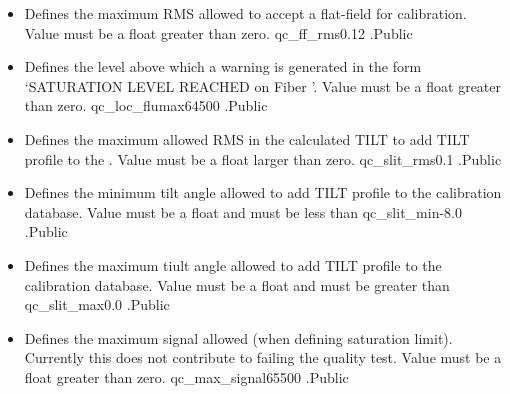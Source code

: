 \begin{itemize}
\item {}
{Defines the maximum RMS allowed to accept a flat-field for calibration. Value must be a float greater than zero.}
{qc\_ff\_rms}{0.12}
{\calFFraw}{\constantsfile}{\calFFraw.\progMAIN}{Public}

\item {}
{Defines the level above which a warning is generated in the form `SATURATION LEVEL REACHED on Fiber '. Value must be a float greater than zero.}
{qc\_loc\_flumax}{64500}
{\calFFraw}{\constantsfile}{\calFFraw.\progMAIN}{Public}

\item {} 
{Defines the maximum allowed RMS in the calculated TILT to add TILT profile to the \calibdb. Value must be a float larger than zero.}
{qc\_slit\_rms}{0.1}
{\calSLIT}{\constantsfile}{\calSLIT.\progMAIN}{Public}

\item {} 
{Defines the minimum tilt angle allowed to add TILT profile to the calibration database. Value must be a float and must be less than }
{qc\_slit\_min}{-8.0}
{\calSLIT}{\constantsfile}{\calSLIT.\progMAIN}{Public}

\item {} 
{Defines the maximum tiult angle allowed to add TILT profile to the calibration database. Value must be a float and must be greater than }
{qc\_slit\_max}{0.0}
{\calSLIT}{\constantsfile}{\calSLIT.\progMAIN}{Public}

\item {} 
{Defines the maximum signal allowed (when defining saturation limit). Currently this does not contribute to failing the quality test. Value must be a float greater than zero.}
{qc\_max\_signal}{65500}
{\calextractRAW}{\constantsfile}{\calextractRAW.\progMAIN}{Public}



\end{itemize}
